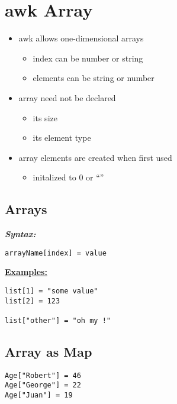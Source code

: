 \documentclass{report}
\begin{document}
\begin{figure}[ht]
    \centering
\end{figure}
\section{awk Array}
\begin{itemize}
  \item awk allows one-dimensional arrays 
    \begin{itemize}[label=$\circ$]
      \item index can be number or string 
      \item elements can be string or number
\end{itemize}
\item array need not be declared
  \begin{itemize}[label=$\circ$]
    \item its size 
    \item its element type
  \end{itemize}
\item array elements are created  when first used
  \begin{itemize}[label=$\circ$]
    \item initalized to 0 or ``'' 
  \end{itemize}
\end{itemize}
\subsection{Arrays}
\bigbreak \noindent
\textbf{\textit{Syntax:}}
\begin{verbatim}
arrayName[index] = value
\end{verbatim}
\bigbreak \noindent
\textbf{\underline{Examples:}}
\begin{mdframed}
\begin{verbatim}
list[1] = "some value"
list[2] = 123

list["other"] = "oh my !"
\end{verbatim}
\end{mdframed}
\subsection*{Array as Map}
\begin{verbatim}
Age["Robert"] = 46
Age["George"] = 22
Age["Juan"] = 19
\end{verbatim}
\newpage
\end{document}
